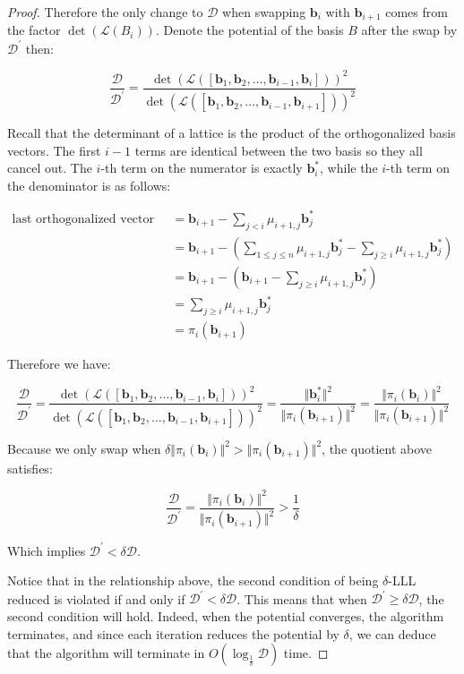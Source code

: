 \begin{proof}
    Therefore the only change to $\mathcal{D}$ when swapping $\mathbf{b}_i$ with $\mathbf{b}_{i+1}$ comes from the factor $\det(\mathcal{L}(B_i))$. Denote the potential of the basis $B$ after the swap by $\mathcal{D}^\prime$ then:

    $$
    \frac{\mathcal{D}}{\mathcal{D}^\prime} = \frac{
        \det(\mathcal{L}([\mathbf{b}_1, \mathbf{b}_2, \ldots, \mathbf{b}_{i-1}, \mathbf{b}_{i}]))^2
    }{
        \det(\mathcal{L}([\mathbf{b}_1, \mathbf{b}_2, \ldots, \mathbf{b}_{i-1}, \mathbf{b}_{i+1}]))^2
    }
    $$

    Recall that the determinant of a lattice is the product of the orthogonalized basis vectors. The first $i-1$ terms are identical between the two basis so they all cancel out. The $i$-th term on the numerator is exactly $\mathbf{b}_i^\ast$, while the $i$-th term on the denominator is as follows:

    $$
    \begin{aligned}
    \text{last orthogonalized vector in the denominator} 
    &= \mathbf{b}_{i+1} - \sum_{j < i} \mu_{i+1, j}\mathbf{b}_j^\ast \\
    &= \mathbf{b}_{i+1} - (\sum_{1 \leq j \leq n} \mu_{i+1, j}\mathbf{b}_j^\ast  
        - \sum_{j \geq i} \mu_{i+1, j}\mathbf{b}_j^\ast) \\
    &= \mathbf{b}_{i+1} - (\mathbf{b}_{i+1}  
        - \sum_{j \geq i} \mu_{i+1, j}\mathbf{b}_j^\ast) \\
    &= \sum_{j \geq i} \mu_{i+1, j}\mathbf{b}_j^\ast \\
    &= \pi_i(\mathbf{b}_{i+1})
    \end{aligned}
    $$

    Therefore we have:

    $$
    \frac{\mathcal{D}}{\mathcal{D}^\prime} = \frac{
        \det(\mathcal{L}([\mathbf{b}_1, \mathbf{b}_2, \ldots, \mathbf{b}_{i-1}, \mathbf{b}_{i}]))^2
    }{
        \det(\mathcal{L}([\mathbf{b}_1, \mathbf{b}_2, \ldots, \mathbf{b}_{i-1}, \mathbf{b}_{i+1}]))^2
    } = \frac{\Vert\mathbf{b}_i^\ast\Vert^2}{\Vert\pi_i(\mathbf{b}_{i+1})\Vert^2}
    = \frac{\Vert\pi_i(\mathbf{b}_{i})\Vert^2}{\Vert\pi_i(\mathbf{b}_{i+1})\Vert^2}
    $$

    Because we only swap when $\delta \Vert \pi_i(\mathbf{b}_i) \Vert^2 > \Vert \pi_i(\mathbf{b}_{i+1}) \Vert^2$, the quotient above satisfies:

    $$
    \frac{\mathcal{D}}{\mathcal{D}^\prime} 
    = \frac{\Vert\pi_i(\mathbf{b}_{i})\Vert^2}{\Vert\pi_i(\mathbf{b}_{i+1})\Vert^2}
    > \frac{1}{\delta}
    $$

    Which implies $\mathcal{D}^\prime < \delta \mathcal{D}$.

    Notice that in the relationship above, the second condition of being $\delta$-LLL reduced is violated if and only if $\mathcal{D}^\prime < \delta\mathcal{D}$. This means that when $\mathcal{D}^\prime \geq \delta\mathcal{D}$, the second condition will hold. Indeed, when the potential converges, the algorithm terminates, and since each iteration reduces the potential by $\delta$, we can deduce that the algorithm will terminate in $O(\log_{\frac{1}{\delta}}\mathcal{D})$ time.
\end{proof}
